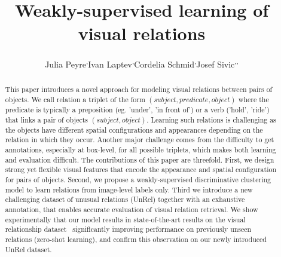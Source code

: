 \documentclass[10pt,twocolumn,letterpaper]{article}
\begin{document}
\title{Weakly-supervised learning of visual relations}


\author{Julia Peyre\footnotemark[1] \textsuperscript{,}\footnotemark[2]
 \qquad Ivan Laptev\footnotemark[1] \textsuperscript{,}\footnotemark[2] \qquad Cordelia Schmid\footnotemark[2] \textsuperscript{,}\footnotemark[4] \qquad Josef Sivic\footnotemark[1] \textsuperscript{,}\footnotemark[2] \textsuperscript{,}\footnotemark[3] \\
}




\maketitle




\begin{abstract}


This paper introduces a novel approach for modeling visual relations
        between pairs of objects.
 We call relation a triplet of the form $(subject,
        predicate, object)$ where the predicate is typically a
        preposition (eg. 'under', 'in front of') or a verb ('hold',
        'ride') that links a pair of objects $(subject,
        object)$. Learning such relations is challenging as the
        objects have different spatial configurations and appearances
        depending on the relation in which they occur. Another major
        challenge comes from the difficulty to get annotations,
        especially at box-level, for all possible triplets, which
        makes both learning and evaluation difficult. The
        contributions of this paper are threefold. First, we design strong yet flexible visual features that 		encode the appearance and spatial configuration for pairs of objects. Second, we propose a
        weakly-supervised discriminative clustering model to learn
        relations from image-level labels only. Third we introduce a
        new challenging dataset of unusual relations (UnRel) together
        with an exhaustive annotation, that enables accurate
        evaluation of visual relation retrieval. We show
        experimentally that our model results in state-of-the-art
        results on the visual relationship dataset~\cite{Lu16}
        significantly improving performance on previously
        unseen relations (zero-shot learning), and confirm this
        observation on our newly introduced UnRel dataset.    
   
\end{abstract}
\end{document}
